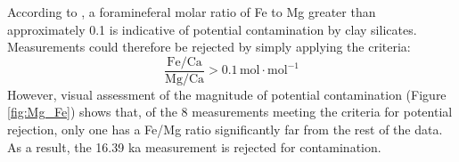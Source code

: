 According to \citeauthor{barker2003study}\parencite{barker2003study}, a foramineferal molar ratio of Fe to Mg greater than approximately 0.1 is indicative of potential contamination by clay silicates. Measurements could therefore be rejected by simply applying the criteria:
\begin{equation} \label{eq:fe_mg}
    \frac{\mathrm{Fe}/\mathrm{Ca}}{\mathrm{Mg}/\mathrm{Ca}} > 0.1 \, \mathrm{mol \cdot mol^{-1}}
\end{equation}
However, visual assessment of the magnitude of potential contamination (Figure \ref{fig:Mg_Fe}) shows that, of the 8 measurements meeting the criteria for potential rejection, only one has a Fe/Mg ratio significantly far from the rest of the data. As a result, the 16.39 ka measurement is rejected for contamination. 
